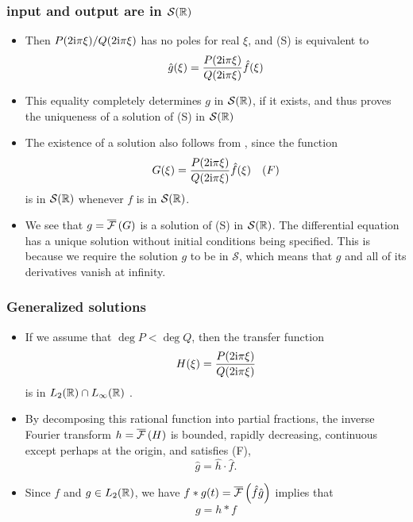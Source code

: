 \begin{frame}
\frametitle{input and output are in $\mathcal{S}(\mathbb{R})$}
\begin{itemize}
\item Then $P(2 \mathrm{i}\pi\xi)/Q(2 \mathrm{i} \pi\xi)$ has no poles for real $\xi$, and  (S) is equivalent to
$$
\hat{g}(\xi)=\frac{P(2 \mathrm{i} \pi\xi)}{Q(2\mathrm{i} \pi\xi)}\hat{f}(\xi)
$$
\item This equality completely determines $g$ in $\mathcal{S}(\mathbb{R})$, if it exists, and thus proves the uniqueness of a solution of (S) in $\mathcal{S}(\mathbb{R})$
\item The existence of a solution also follows from , since the function
$$
G(\xi)=\frac{P(2\mathrm{i} \pi\xi)}{Q(2 \mathrm{i} \pi\xi)}\hat{f}(\xi) \quad (F)
$$
is in $\mathcal{S}(\mathbb{R})$ whenever $f$ is in $\mathcal{S}(\mathbb{R})$. 
\item We see that $g=\overline{\mathcal{F}}\left( G \right)$ is a solution of (S) in $\mathcal{S}(\mathbb{R})$.
{\tiny The differential equation has a unique solution without initial conditions being specified. This is because we require the solution $g$ to be in $\mathcal{S}$, which means that $g$ and all of its derivatives vanish at infinity.}
\end{itemize}
\end{frame}

\begin{frame}
\frametitle{Generalized solutions}
\begin{itemize}
\item If we assume that $\deg P<\deg Q$, then the transfer function
$$
H(\xi)=\frac{P(2 \mathrm{i} \pi\xi)}{Q(2 \mathrm{i} \pi\xi)} 
$$
is in $L_2(\mathbb{R}) \cap L_\infty(\mathbb{R})$ . 
\item By decomposing this rational function into partial fractions, the inverse Fourier transform $h=\overline{\mathcal{F}}\left( H \right)$  is bounded, rapidly decreasing, continuous except perhaps at the origin, and satisfies (F),
$$
\hat{g}=\hat{h}\cdot\hat{f}.
$$
\item Since $f$ and $g \in L_2(\mathbb{R})$, we have $f * g(t)= \overline{\mathcal{F}}\left( \hat{f} \hat{g} \right)$ implies that
$$
g=h*f
$$
\end{itemize}
\end{frame}

